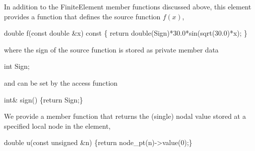 In addition to the {\ttfamily Finite\+Element} member functions discussed above, this element provides a function that defines the source function $ f(x) $,  
\begin{DoxyCodeInclude}
  \textcolor{keywordtype}{double} f(\textcolor{keyword}{const} \textcolor{keywordtype}{double} &x) \textcolor{keyword}{const} 
   \{
    \textcolor{keywordflow}{return} double(Sign)*30.0*sin(sqrt(30.0)*x);
   \}

\end{DoxyCodeInclude}


where the sign of the source function is stored as private member data  
\begin{DoxyCodeInclude}
  \textcolor{keywordtype}{int} Sign;

\end{DoxyCodeInclude}


and can be set by the access function  
\begin{DoxyCodeInclude}
  \textcolor{keywordtype}{int}& sign() \{\textcolor{keywordflow}{return} Sign;\}

\end{DoxyCodeInclude}


We provide a member function that returns the (single) nodal value stored at a specified local node in the element,  
\begin{DoxyCodeInclude}
  \textcolor{keywordtype}{double} u(\textcolor{keyword}{const} \textcolor{keywordtype}{unsigned} &n) \{\textcolor{keywordflow}{return} node\_pt(n)->value(0);\}

\end{DoxyCodeInclude}


